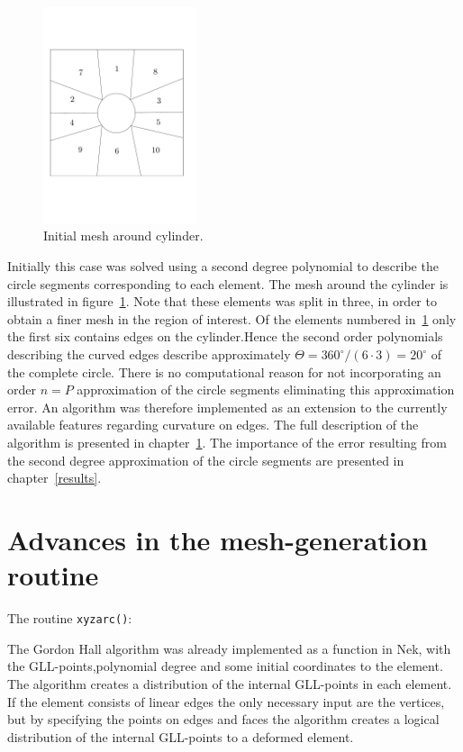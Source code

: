 %
\begin{figure}[h]
    \centering
    \includegraphics[width = 0.4\textwidth]{Figures/cyl_elem.pdf}
    \caption{Initial mesh around cylinder.}
    \label{fig:cyl_elem}
\end{figure}
%
Initially this case was solved using a second degree polynomial to describe the circle segments
corresponding to each element. The mesh around the cylinder is illustrated in figure~\ref{fig:cyl_elem}.
Note that these elements was split in three, in order to obtain 
a finer mesh in the region of interest. Of the elements numbered in~\ref{fig:cyl_elem}
only the first six contains edges on the cylinder.Hence the second order polynomials 
describing the curved edges describe approximately $\Theta = 360^{\circ}/(6\cdot 3) = 20^{\circ}$
of the complete circle. There is no computational reason 
for not incorporating an order $n=P$ approximation of the circle segments eliminating 
this approximation error. An algorithm was therefore implemented as an extension to the
currently available features regarding curvature on edges.
The full description of the algorithm is presented in 
chapter~\ref{xyzarc}. The importance of the error resulting from the second degree approximation
of the circle segments are presented in chapter~\ref{results}.
%
%
%
\section{Advances in the mesh-generation routine} \label{xyzarc}
The routine \verb|xyzarc()|:

The Gordon Hall algorithm was already implemented as a function in Nek, with the GLL-points,polynomial degree and some initial 
coordinates to the element. The algorithm creates a distribution of the internal GLL-points in each element. 
If the element consists of linear edges the only necessary input are the vertices, but by specifying the points on edges and faces
the algorithm creates a logical distribution of the internal GLL-points to a deformed element. 

